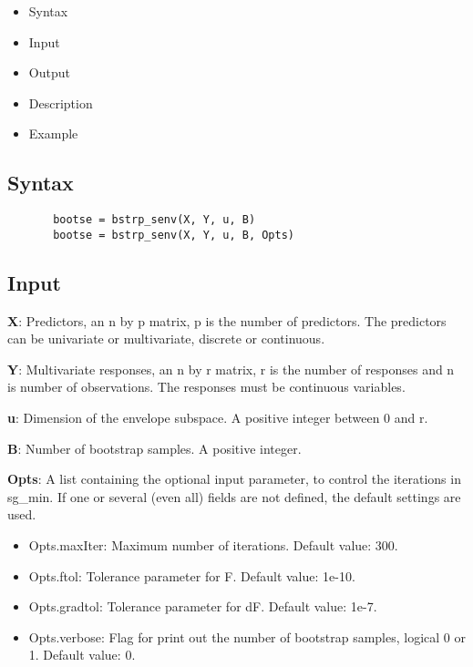 \documentclass[a4paper,11pt,openany]{memoir}
\begin{document}
\begin{itemize}
\setlength{\itemsep}{-1ex}
   \item Syntax
   \item Input
   \item Output
   \item Description
   \item Example
\end{itemize}


\subsection*{Syntax}


\begin{verbatim}       bootse = bstrp_senv(X, Y, u, B)
       bootse = bstrp_senv(X, Y, u, B, Opts)\end{verbatim}
    

\subsection*{Input}

\begin{par}
\textbf{X}: Predictors, an n by p matrix, p is the number of predictors.  The predictors can be univariate or multivariate, discrete or continuous.
\end{par} \vspace{1em}
\begin{par}
\textbf{Y}: Multivariate responses, an n by r matrix, r is the number of responses and n is number of observations.  The responses must be continuous variables.
\end{par} \vspace{1em}
\begin{par}
\textbf{u}: Dimension of the envelope subspace.  A positive integer between 0 and r.
\end{par} \vspace{1em}
\begin{par}
\textbf{B}: Number of bootstrap samples.  A positive integer.
\end{par} \vspace{1em}
\begin{par}
\textbf{Opts}: A list containing the optional input parameter, to control the iterations in sg\_min. If one or several (even all) fields are not defined, the default settings are used.
\end{par} \vspace{1em}
\begin{itemize}
\setlength{\itemsep}{-1ex}
   \item Opts.maxIter: Maximum number of iterations.  Default value: 300.
   \item Opts.ftol: Tolerance parameter for F.  Default value: 1e-10.
   \item Opts.gradtol: Tolerance parameter for dF.  Default value: 1e-7.
   \item Opts.verbose: Flag for print out the number of bootstrap samples, logical 0 or 1. Default value: 0.
\end{itemize}
\end{document}
